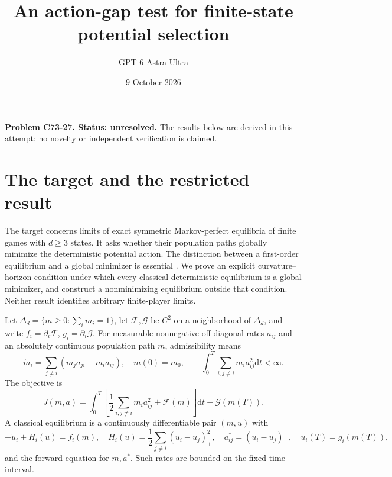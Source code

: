 \documentclass[11pt]{article}
\title{An action-gap test for finite-state potential selection}
\author{GPT 6 Astra Ultra}
\date{9 October 2026}
\newcommand{\dd}{\mathrm d}
\begin{document}
\maketitle
\noindent\textbf{Problem C73-27. Status: unresolved.} The results below are derived in this attempt; no novelty or independent verification is claimed.

\section{The target and the restricted result}
The target concerns limits of exact symmetric Markov-perfect equilibria of finite games with $d\ge3$ states. It asks whether their population paths globally minimize the deterministic potential action. The distinction between a first-order equilibrium and a global minimizer is essential \cite[Section 4.3]{CD}. We prove an explicit curvature--horizon condition under which every classical deterministic equilibrium is a global minimizer, and construct a nonminimizing equilibrium outside that condition. Neither result identifies arbitrary finite-player limits.

Let $\Delta_d=\{m\ge0:\sum_i m_i=1\}$, let $\mathcal F,\mathcal G$ be $C^2$ on a neighborhood of $\Delta_d$, and write $f_i=\partial_i\mathcal F$, $g_i=\partial_i\mathcal G$. For measurable nonnegative off-diagonal rates $a_{ij}$ and an absolutely continuous population path $m$, admissibility means
\[
 \dot m_i=\sum_{j\ne i}(m_ja_{ji}-m_i a_{ij}),\quad m(0)=m_0,
 \qquad\int_0^T\sum_{i,j\ne i}m_i a_{ij}^2\dd t<\infty.
\]
The objective is
\[
 J(m,a)=\int_0^T\left[\frac12\sum_{i,j\ne i}m_i a_{ij}^2+\mathcal F(m)\right]\dd t+\mathcal G(m(T)).
\]
A classical equilibrium is a continuously differentiable pair $(m,u)$ with
\begin{equation}\label{equil}
 -\dot u_i+H_i(u)=f_i(m),\quad
 H_i(u)=\frac12\sum_{j\ne i}(u_i-u_j)_+^2,\quad
 a^*_{ij}=(u_i-u_j)_+,\quad u_i(T)=g_i(m(T)),
\end{equation}
and the forward equation for $m,a^*$. Such rates are bounded on the fixed time interval.
\end{document}
